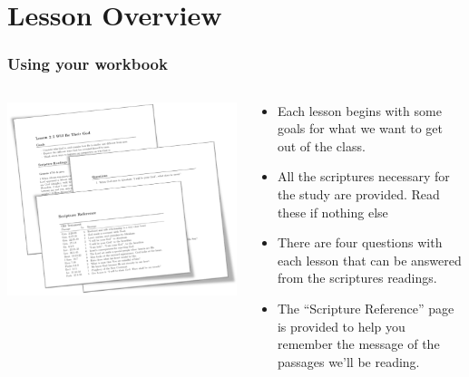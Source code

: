 \section{Lesson Overview}

\begin{frame}
\frametitle{Using your workbook}
\begin{columns}
\begin{column}{0.4\textwidth}
\includegraphics[width=1.3\columnwidth]{figures/workbook.PNG}
\end{column}
\begin{column}{0.6\textwidth}
\begin{itemize}
\item Each lesson begins with some goals for what we want to get out of the class.
\item All the scriptures necessary for the study are provided. \alert{Read these if nothing else}
\item There are four questions with each lesson that can be answered from the scriptures readings.
\item The ``Scripture Reference'' page is provided to help you remember the message of the passages we'll be reading.
\end{itemize}
\end{column}
\end{columns}
\end{frame}

